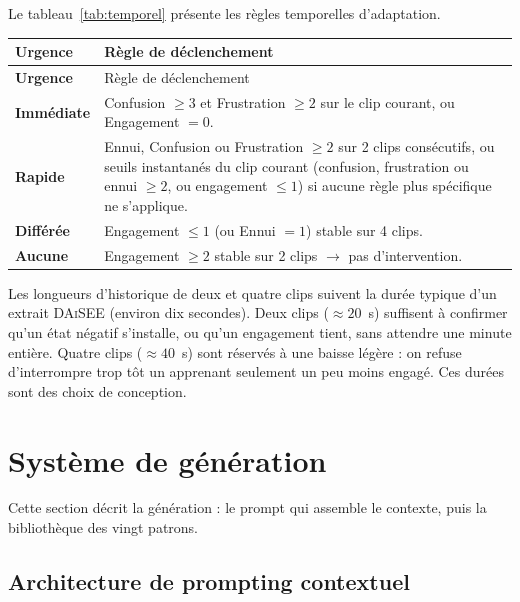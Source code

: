 Le tableau~\ref{tab:temporel} présente les règles temporelles d'adaptation.

{\small
\renewcommand{\arraystretch}{1.18}
\setlength{\tabcolsep}{4pt}
\begin{xltabular}{\textwidth}{|>{\bfseries}l|X|}
\hline
{}
Urgence & Règle de déclenchement \\
\hline
\endfirsthead
\hline
{}
Urgence & Règle de déclenchement \\
\hline
\endhead
\endfoot
\endlastfoot
Immédiate & Confusion $\geq 3$ et Frustration $\geq 2$ sur le clip courant, ou Engagement $= 0$. \\
\hline
Rapide    & Ennui, Confusion ou Frustration $\geq 2$ sur 2 clips consécutifs, 
            ou seuils instantanés du clip courant (confusion, frustration ou
            ennui $\geq 2$, ou engagement $\leq 1$) si aucune règle plus
            spécifique ne s'applique. \\
\hline
Différée  & Engagement $\leq 1$ (ou Ennui $= 1$) stable sur 4 clips. \\
\hline
Aucune    & Engagement $\geq 2$ stable sur 2 clips $\rightarrow$ pas d'intervention. \\
\hline
\end{xltabular}
\label{tab:temporel}
\label{tab:urgence-temporelle}
}

Les longueurs d'historique de deux et quatre clips suivent la durée typique d'un
extrait \textsc{DAiSEE} (environ dix secondes). Deux clips
($\approx 20$~s) suffisent à confirmer qu'un état négatif s'installe,
ou qu'un engagement tient, sans attendre une minute entière. Quatre
clips ($\approx 40$~s) sont réservés à une baisse légère : on refuse
d'interrompre trop tôt un apprenant seulement un peu moins engagé.
Ces durées sont des choix de conception.

\section{Système de génération}
\label{sec:generation}

Cette section décrit la génération : le prompt qui assemble le
contexte, puis la bibliothèque des vingt patrons.

\subsection{Architecture de prompting contextuel}

